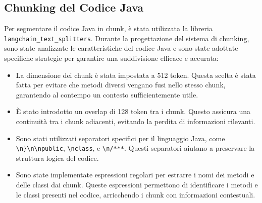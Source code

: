 \documentclass[12pt,a4paper,openright,twoside]{book}
\begin{document}
\subsection{Chunking del Codice Java}
Per segmentare il codice Java in chunk, è stata utilizzata la libreria \texttt{langchain\_text\_splitters}.
Durante la progettazione del sistema di chunking, sono state analizzate le caratteristiche del codice Java e sono state adottate specifiche strategie per garantire una suddivisione efficace e accurata:
\begin{itemize}
    \item La dimensione dei chunk è stata impostata a 512 token. 
    Questa scelta è stata fatta per evitare che metodi diversi vengano fusi nello stesso chunk, garantendo al contempo un contesto sufficientemente utile.
    \item È stato introdotto un overlap di 128 token tra i chunk. Questo assicura una continuità tra i chunk adiacenti, evitando la perdita di informazioni rilevanti.
    \item Sono stati utilizzati separatori specifici per il linguaggio Java, come \texttt{\textbackslash n\}\textbackslash n\textbackslash npublic}, \texttt{\textbackslash nclass}, e \texttt{\textbackslash n/***}.
    Questi separatori aiutano a preservare la struttura logica del codice.
    \item Sono state implementate espressioni regolari per estrarre i nomi dei metodi e delle classi dai chunk.
    Queste espressioni permettono di identificare i metodi e le classi presenti nel codice, arricchendo i chunk con informazioni contestuali.
\end{itemize}
\newpage
\end{document}
